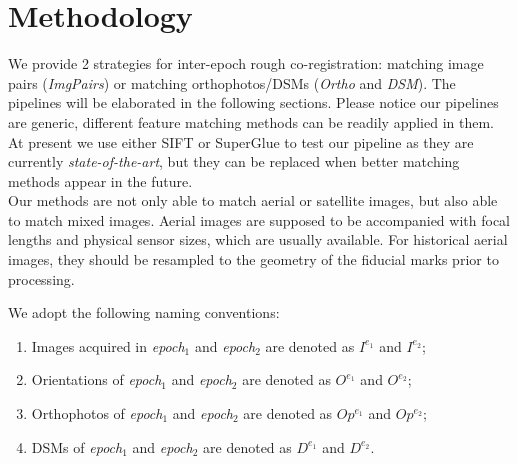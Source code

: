 \section{Methodology}
We provide 2 strategies for inter-epoch rough co-registration: matching image pairs (\textit{ImgPairs}) or matching orthophotos/DSMs (\textit{Ortho} and \textit{DSM}). The pipelines will be elaborated in the following sections. Please notice our pipelines are generic, different feature matching methods can be readily applied in them. At present we use either SIFT or SuperGlue to test our pipeline as they are currently \textit{state-of-the-art}, but they can be replaced when better matching methods appear in the future.\\
Our methods are not only able to match aerial or satellite images, but also able to match mixed images. Aerial images are supposed to be accompanied with focal lengths and physical sensor sizes, which are usually available. For historical aerial images, they should be resampled to the geometry of the fiducial marks prior to processing. 
\par
We adopt the following naming conventions:\\
\begin{enumerate}
    \item Images acquired in \textit{epoch$_1$} and \textit{epoch$_2$} are denoted as $I^{e_1}$ and $I^{e_2}$;
    \item Orientations of \textit{epoch$_1$} and \textit{epoch$_2$} are denoted as $O^{e_1}$ and $O^{e_2}$; 
    \item Orthophotos of \textit{epoch$_1$} and \textit{epoch$_2$} are denoted as $Op^{e_1}$ and $Op^{e_2}$; 
    \item DSMs of \textit{epoch$_1$} and \textit{epoch$_2$} are denoted as $D^{e_1}$ and $D^{e_2}$.
\end{enumerate}
